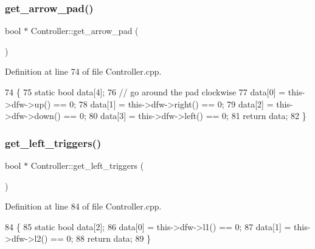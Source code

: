 \subsubsection{\texorpdfstring{get\+\_\+arrow\+\_\+pad()}{get\_arrow\_pad()}}
{\footnotesize\ttfamily bool $\ast$ Controller\+::get\+\_\+arrow\+\_\+pad (\begin{DoxyParamCaption}{ }\end{DoxyParamCaption})}



Definition at line 74 of file Controller.\+cpp.


\begin{DoxyCode}
74                                 \{
75     \textcolor{keyword}{static} \textcolor{keywordtype}{bool} data[4];
76     \textcolor{comment}{// go around the pad clockwise}
77     data[0] = this->dfw->up() == 0;
78     data[1] = this->dfw->right() == 0;
79     data[2] = this->dfw->down() == 0;
80     data[3] = this->dfw->left() == 0;
81     \textcolor{keywordflow}{return} data;
82 \}
\end{DoxyCode}
\mbox{\label{class_controller_abeab6704d15e871e16beaf2c82d8c1f2}} 
\subsubsection{\texorpdfstring{get\+\_\+left\+\_\+triggers()}{get\_left\_triggers()}}
{\footnotesize\ttfamily bool $\ast$ Controller\+::get\+\_\+left\+\_\+triggers (\begin{DoxyParamCaption}{ }\end{DoxyParamCaption})}



Definition at line 84 of file Controller.\+cpp.


\begin{DoxyCode}
84                                     \{
85     \textcolor{keyword}{static} \textcolor{keywordtype}{bool} data[2];
86     data[0] = this->dfw->l1() == 0;
87     data[1] = this->dfw->l2() == 0;
88     \textcolor{keywordflow}{return} data;
89 \}
\end{DoxyCode}
\mbox{\label{class_controller_a590216b5d6e1fc904c62e8ed213c2767}} 
